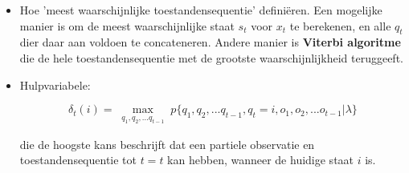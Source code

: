 \begin{itemize}
\begin{itemize}
		\item Hoe 'meest waarschijnlijke toestandensequentie' definiëren. Een mogelijke manier is om de meest waarschijnlijke staat $s_t$ voor $x_t$ te berekenen, en alle $q_t$ dier daar aan voldoen te concateneren.
		Andere manier is \textbf{Viterbi algoritme} die de hele toestandensequentie met de grootste waarschijnlijkheid teruggeeft.
		
		\item Hulpvariabele:
		
		$$\delta_t(i) = \max_{\substack{q_1, q_2, ... q_{t-1}}} p\{q_1, q_2, ... q_{t - 1}, q_t = i, o_1, o_2, ... o_{t - 1} | \lambda \}$$
		
		die de hoogste kans beschrijft dat een partiele observatie en toestandensequentie tot $t = t$ kan hebben, wanneer de huidige staat $i$ is.
	\end{itemize}
\end{itemize}

